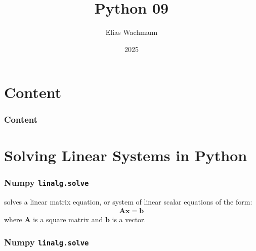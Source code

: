 \documentclass{beamer}
\title[]
{Python 09}
\author[E.~Wachmann]{\scriptsize Elias Wachmann
}
\date{2025} %
\institute[Institute of Theoretical and Computational Physics]
{
}
\begin{document}
\titleframe


\section*{Content}

\begin{frame}
\frametitle{Content}
  \tableofcontents
\end{frame}

\section{Solving Linear Systems in Python}
\begin{frame}
  \frametitle{Numpy \texttt{linalg.solve}}
   solves a linear matrix equation, or system of linear scalar equations of the form: 
  \begin{align}
    \mathbf{A} \mathbf{x} = \mathbf{b}
  \end{align}
  where $\mathbf{A}$ is a square matrix and $\mathbf{b}$ is a vector.\\
\end{frame}
\begin{frame}
  \frametitle{Numpy \texttt{linalg.solve}}
  
\end{frame}
\end{document}
